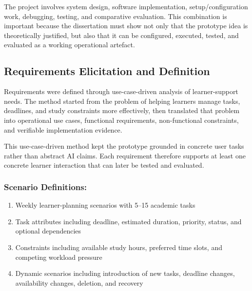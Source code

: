 \documentclass[12pt]{article}
\begin{document}
The project involves system design, software implementation, setup/configuration work, debugging, testing, and comparative evaluation. This combination is important because the dissertation must show not only that the prototype idea is theoretically justified, but also that it can be configured, executed, tested, and evaluated as a working operational artefact.

\subsection{Requirements Elicitation and Definition}

Requirements were defined through use-case-driven analysis of learner-support needs. The method started from the problem of helping learners manage tasks, deadlines, and study constraints more effectively, then translated that problem into operational use cases, functional requirements, non-functional constraints, and verifiable implementation evidence.

This use-case-driven method kept the prototype grounded in concrete user tasks rather than abstract AI claims. Each requirement therefore supports at least one concrete learner interaction that can later be tested and evaluated.

\subsubsection{Scenario Definitions:}
\begin{enumerate}
    \item Weekly learner-planning scenarios with 5--15 academic tasks
    \item Task attributes including deadline, estimated duration, priority, status, and optional dependencies
    \item Constraints including available study hours, preferred time slots, and competing workload pressure
    \item Dynamic scenarios including introduction of new tasks, deadline changes, availability changes, deletion, and recovery
\end{enumerate}
\end{document}
